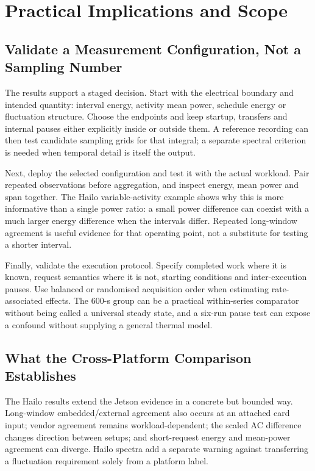 \section{Practical Implications and Scope}
\subsection{Validate a Measurement Configuration, Not a Sampling Number}
The results support a staged decision. Start with the electrical boundary and intended quantity: interval energy, activity mean power, schedule energy or fluctuation structure. Choose the endpoints and keep startup, transfers and internal pauses either explicitly inside or outside them. A reference recording can then test candidate sampling grids for that integral; a separate spectral criterion is needed when temporal detail is itself the output.

Next, deploy the selected configuration and test it with the actual workload. Pair repeated observations before aggregation, and inspect energy, mean power and span together. The Hailo variable-activity example shows why this is more informative than a single power ratio: a small power difference can coexist with a much larger energy difference when the intervals differ. Repeated long-window agreement is useful evidence for that operating point, not a substitute for testing a shorter interval.

Finally, validate the execution protocol. Specify completed work where it is known, request semantics where it is not, starting conditions and inter-execution pauses. Use balanced or randomised acquisition order when estimating rate-associated effects. The 600-s group can be a practical within-series comparator without being called a universal steady state, and a six-run pause test can expose a confound without supplying a general thermal model.

\subsection{What the Cross-Platform Comparison Establishes}
The Hailo results extend the Jetson evidence in a concrete but bounded way. Long-window embedded/external agreement also occurs at an attached card input; vendor agreement remains workload-dependent; the scaled AC difference changes direction between setups; and short-request energy and mean-power agreement can diverge. Hailo spectra add a separate warning against transferring a fluctuation requirement solely from a platform label.

